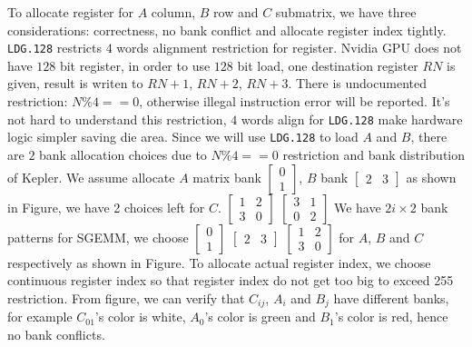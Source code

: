 \documentclass{sig-alternate-05-2015}
\begin{document}
To allocate register for $A$ column, $B$ row and $C$ submatrix, we have three considerations: correctness, no bank
conflict and allocate register index tightly.
{\tt LDG.128} restricts $4$ words alignment restriction for register.
Nvidia GPU does not have $128$ bit register, in order to use $128$ bit load, one destination register $RN$ is given, result is writen to
$RN+1$, $RN+2$, $RN+3$. There is undocumented restriction: $N\%4==0$, otherwise illegal instruction error will be reported.
It's not hard to understand this restriction, $4$ words align for {\tt LDG.128} make hardware logic simpler saving die area.
Since we will use {\tt LDG.128} to load $A$ and $B$, there are $2$ bank allocation choices due to $N\%4==0$ restriction and
bank distribution of Kepler. We assume allocate $A$ matrix bank $\begin{bmatrix} 0 \\ 1  \end{bmatrix}$,
$B$ bank $\begin{bmatrix} 2 & 3 \end{bmatrix}$ as shown in Figure, we have 2 choices left for $C$.
$\begin{bmatrix} 1 & 2 \\ 3 & 0  \end{bmatrix}$
$\begin{bmatrix} 3 & 1 \\ 0 & 2  \end{bmatrix}$
We have $2i\times2$ bank patterns for SGEMM, we choose $\begin{bmatrix} 0 \\ 1  \end{bmatrix}$ $\begin{bmatrix} 2 & 3 \end{bmatrix}$
$\begin{bmatrix} 1 & 2 \\ 3 & 0  \end{bmatrix}$ for $A$, $B$ and $C$ respectively as shown in Figure.
To allocate actual register index, we choose continuous register index so that register index do not get too big to
exceed 255 restriction. From figure, we can verify that $C_{ij}$, $A_i$ and $B_j$ have different banks, for example
$C_{01}$'s color is white, $A_0$'s color is green and $B_1$'s color is red, hence no bank conflicts.
\end{document}
